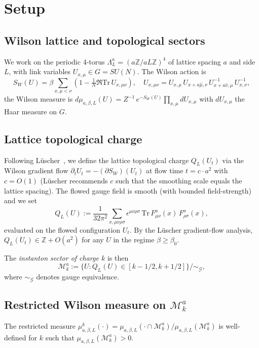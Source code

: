 \documentclass[11pt,a4paper]{amsart}
\theoremstyle{definition}
\newcommand{\Z}{\mathbb{Z}}
\newcommand{\Tr}{\mathrm{Tr}}
\newcommand{\Mmod}{\mathcal{M}}
\begin{document}
\section{Setup}\label{sec:setup}

\subsection{Wilson lattice and topological sectors}
We work on the periodic 4-torus
$\Lambda_L^a = (a\Z/aL\Z)^4$ of lattice spacing $a$ and side $L$,
with link variables $U_{x,\mu}\in G = SU(N)$. The Wilson action is
\begin{equation}\label{eq:Wilson-action}
S_W(U) = \beta \sum_{x,\mu<\nu}
  \left(1 - \tfrac{1}{N}\Re\Tr\, U_{x,\mu\nu}\right),
\quad
U_{x,\mu\nu} = U_{x,\mu}\,U_{x+a\hat\mu,\nu}\,
  U_{x+a\hat\nu,\mu}^{-1}\,U_{x,\nu}^{-1},
\end{equation}
the Wilson measure is
$d\mu_{a,\beta,L}(U) = Z^{-1}\,e^{-S_W(U)}\prod_{x,\mu} dU_{x,\mu}$
with $dU_{x,\mu}$ the Haar measure on $G$.

\subsection{Lattice topological charge}
Following L\"uscher~\cite{Luscher2010WilsonFlow}, we define the lattice
topological charge $Q_L(U_t)$ via the Wilson gradient flow $\partial_t
U_t = -(\partial S_W)(U_t)$ at flow time $t = c\cdot a^2$ with $c=O(1)$
(L\"uscher recommends $c$ such that the smoothing scale equals the
lattice spacing). The flowed gauge field is smooth (with bounded
field-strength) and we set
\begin{equation}\label{eq:lattice-charge}
Q_L(U) := \frac{1}{32\pi^2}\sum_{x,\mu\nu\rho\sigma}
\epsilon^{\mu\nu\rho\sigma}\,\Tr\, F_{\mu\nu}^a(x)\,F_{\rho\sigma}^a(x),
\end{equation}
evaluated on the flowed configuration $U_t$. By the L\"uscher gradient-flow
analysis, $Q_L(U_t) \in \Z + O(a^2)$ for any $U$ in the regime
$\beta\geq\beta_0$.

The \emph{instanton sector of charge $k$} is then
\begin{equation}\label{eq:instanton-sector}
\Mmod_k^a := \{U : Q_L(U)\in[k-1/2,k+1/2]\}/\sim_\mathcal G,
\end{equation}
where $\sim_\mathcal G$ denotes gauge equivalence.

\subsection{Restricted Wilson measure on $\Mmod_k^a$}
The restricted measure
$\mu^k_{a,\beta,L}(\cdot) = \mu_{a,\beta,L}(\cdot \cap \Mmod_k^a) /
\mu_{a,\beta,L}(\Mmod_k^a)$
is well-defined for $k$ such that $\mu_{a,\beta,L}(\Mmod_k^a) > 0$.
\end{document}
